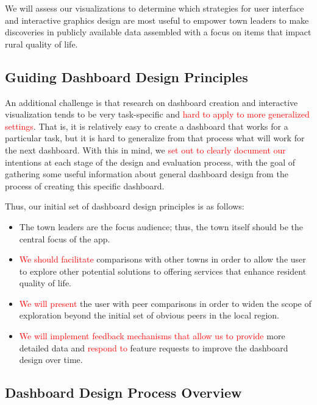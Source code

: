 \documentclass[letterpaper,inpress]{jdsart}
\begin{document}
We will assess our visualizations to determine which strategies for user interface and interactive graphics design are most useful to empower town leaders to make discoveries in publicly available data assembled with a focus on items that impact rural quality of life.

\subsection{Guiding Dashboard Design Principles}

An additional challenge is that research on dashboard creation and interactive visualization tends to be very task-specific and {\textcolor{red}{hard to apply to more generalized settings}}. That is, it is relatively easy to create a dashboard that works for a particular task, but it is hard to generalize from that process what will work for the next dashboard. With this in mind, we {\textcolor{red}{set out to clearly document our}} intentions at each stage of the design and evaluation process, with the goal of gathering some useful information about general dashboard design from the process of creating this specific dashboard.

Thus, our initial set of dashboard design principles is as follows:

\begin{itemize}
\item The town leaders are the focus audience; thus, the town itself should be the central focus of the app.
\item {\textcolor{red}{We should facilitate}} comparisons with other towns in order to allow the user to explore other potential solutions to offering services that enhance resident quality of life.
\item {\textcolor{red}{We will present}} the user with peer comparisons in order to widen the scope of exploration beyond the initial set of obvious peers in the local region.
\item {\textcolor{red}{We will implement feedback mechanisms that allow us to provide}} more detailed data and {\textcolor{red}{respond to}} feature requests to improve the dashboard design over time.
\end{itemize}

\subsection{Dashboard Design Process Overview}
\end{document}
